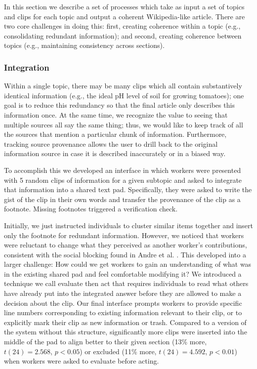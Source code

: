 In this section we describe a set of processes which take as input a set of topics and clips for each topic and output a coherent Wikipedia-like article. There are two core challenges in doing this: first, creating coherence within a topic (e.g., consolidating redundant information); and second, creating coherence between topics (e.g., maintaining consistency across sections). 

\subsubsection{Integration}

Within a single topic, there may be many clips which all contain substantively identical information (e.g., the ideal pH level of soil for growing tomatoes); one goal is to reduce this redundancy so that the final article only describes this information once. At the same time, we recognize the value to seeing that multiple sources all say the same thing; thus, we would like to keep track of all the sources that mention a particular chunk of information. Furthermore, tracking source provenance allows the user to drill back to the original information source in case it is described inaccurately or in a biased way.

To accomplish this we developed an interface in which workers were presented with 5 random clips of information for a given subtopic and asked to integrate that information into a shared text pad. Specifically, they were asked to write the gist of the clip in their own words and transfer the provenance of the clip as a footnote. Missing footnotes triggered a verification check.

Initially, we just instructed individuals to cluster similar items together and insert only the footnote for redundant information. However, we noticed that workers were reluctant to change what they perceived as another worker’s contributions, consistent with the social blocking found in Andre et al. \cite{andre2014effects}. This developed into a larger challenge: How could we get workers to gain an understanding of what was in the existing shared pad and feel comfortable modifying it? We introduced a technique we call evaluate then act that requires individuals to read what others have already put into the integrated answer before they are allowed to make a decision about the clip. Our final interface prompts workers to provide specific line numbers corresponding to existing information relevant to their clip, or to explicitly mark their clip as new information or trash. Compared to a version of the system without this structure, significantly more clips were inserted into the middle of the pad to align better to their given section (13\% more, $t(24) = 2.568$, $p < 0.05$) or excluded (11\% more, $t(24) = 4.592$, $p < 0.01$) when workers were asked to evaluate before acting.

